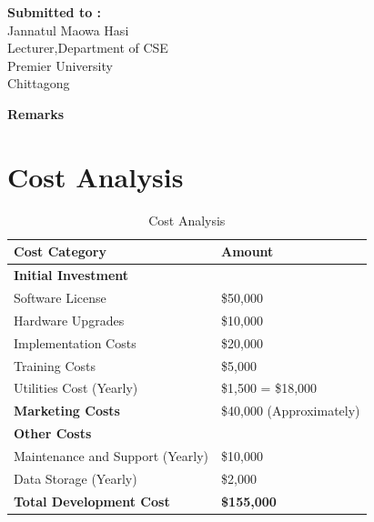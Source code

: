 \documentclass{scrreprt}
\begin{document}
\begin{titlepage}
\begin{minipage}[t]{0.5\textwidth}
        \textbf{Submitted to :}
        \\Jannatul Maowa Hasi
        \\Lecturer,Department of CSE
        \\ Premier University
        \\ Chittagong
    \end{minipage}%
    \begin{minipage}[t]{0.6\textwidth}
        \raggedleft
        \textbf{Remarks}\\
        \vspace{0.5cm} %
    \end{minipage}

    \date{\today}
    \vfill
\end{titlepage}

\section*{Cost Analysis}

\begin{table}[h!]
\centering
\begin{tabular}{|p{8cm}|p{4cm}|}
\hline
\textbf{Cost Category} & \textbf{Amount} \\
\hline
\textbf{Initial Investment} & \\
\hline
\hspace{10pt} Software License & \$50{,}000 \\
\hline
\hspace{10pt} Hardware Upgrades & \$10{,}000 \\
\hline
\hspace{10pt} Implementation Costs & \$20{,}000 \\
\hline
\hspace{10pt} Training Costs & \$5{,}000 \\
\hline
\hspace{10pt} Utilities Cost (Yearly) & \$1{,}500 \times 12 = \$18{,}000 \\
\hline
\textbf{Marketing Costs} & \$40{,}000 (Approximately) \\
\hline
\textbf{Other Costs} & \\
\hline
\hspace{10pt} Maintenance and Support (Yearly) & \$10{,}000 \\
\hline
\hspace{10pt} Data Storage (Yearly) & \$2{,}000 \\
\hline
\textbf{Total Development Cost} & \textbf{\$155{,}000} \\
\hline
\end{tabular}
\caption{Cost Analysis}
\end{table}
\end{document}
